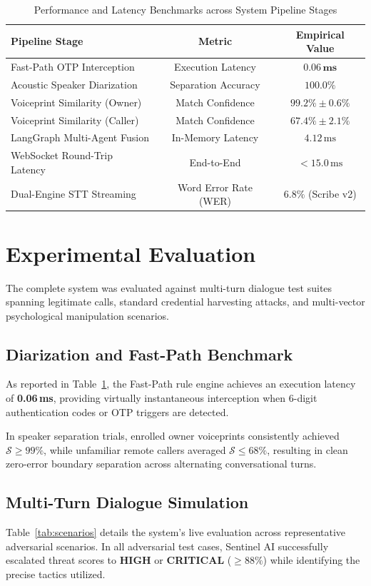 \documentclass[conference]{IEEEtran}
\begin{document}
\begin{table}[!t]
\caption{Performance and Latency Benchmarks across System Pipeline Stages}
\label{tab:benchmarks}
\centering
\begin{tabularx}{\columnwidth}{Xcc}
\toprule
\textbf{Pipeline Stage} & \textbf{Metric} & \textbf{Empirical Value} \\
\midrule
Fast-Path OTP Interception & Execution Latency & $\mathbf{0.06\,\text{ms}}$ \\
Acoustic Speaker Diarization & Separation Accuracy & $\mathbf{100.0\%}$ \\
Voiceprint Similarity (Owner) & Match Confidence & $99.2\% \pm 0.6\%$ \\
Voiceprint Similarity (Caller) & Match Confidence & $67.4\% \pm 2.1\%$ \\
LangGraph Multi-Agent Fusion & In-Memory Latency & $4.12\,\text{ms}$ \\
WebSocket Round-Trip Latency & End-to-End & $< 15.0\,\text{ms}$ \\
Dual-Engine STT Streaming & Word Error Rate (WER) & $6.8\%$ (Scribe v2) \\
\bottomrule
\end{tabularx}
\end{table}

\section{Experimental Evaluation}
The complete system was evaluated against multi-turn dialogue test suites spanning legitimate calls, standard credential harvesting attacks, and multi-vector psychological manipulation scenarios.

\subsection{Diarization and Fast-Path Benchmark}
As reported in Table~\ref{tab:benchmarks}, the Fast-Path rule engine achieves an execution latency of \textbf{0.06\,ms}, providing virtually instantaneous interception when 6-digit authentication codes or OTP triggers are detected.

In speaker separation trials, enrolled owner voiceprints consistently achieved $\mathcal{S} \ge 99\%$, while unfamiliar remote callers averaged $\mathcal{S} \le 68\%$, resulting in clean zero-error boundary separation across alternating conversational turns.

\subsection{Multi-Turn Dialogue Simulation}
Table~\ref{tab:scenarios} details the system's live evaluation across representative adversarial scenarios. In all adversarial test cases, Sentinel AI successfully escalated threat scores to \textbf{HIGH} or \textbf{CRITICAL} ($\ge 88\%$) while identifying the precise tactics utilized.
\end{document}
